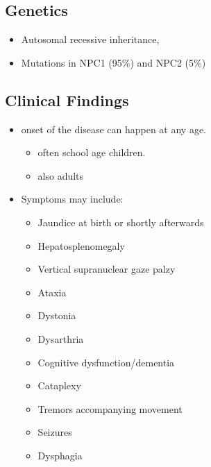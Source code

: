 \documentclass{scrartcl}
\begin{document}
\subsection{Genetics}
\label{sec:org627c21e}
\begin{itemize}
\item Autosomal recessive inheritance,
\item Mutations in NPC1 (95\%) and NPC2 (5\%)
\end{itemize}

\subsection{Clinical Findings}
\label{sec:org5d20eb8}
\begin{itemize}
\item onset of the disease can happen at any age.
\begin{itemize}
\item often school age children.
\item also adults
\end{itemize}

\item Symptoms may include:
\begin{itemize}
\item Jaundice at birth or shortly afterwards
\item Hepatosplenomegaly
\item Vertical supranuclear gaze palzy
\item Ataxia
\item Dystonia
\item Dysarthria
\item Cognitive dysfunction/dementia
\item Cataplexy
\item Tremors accompanying movement
\item Seizures
\item Dysphagia
\end{itemize}
\end{itemize}
\end{document}

